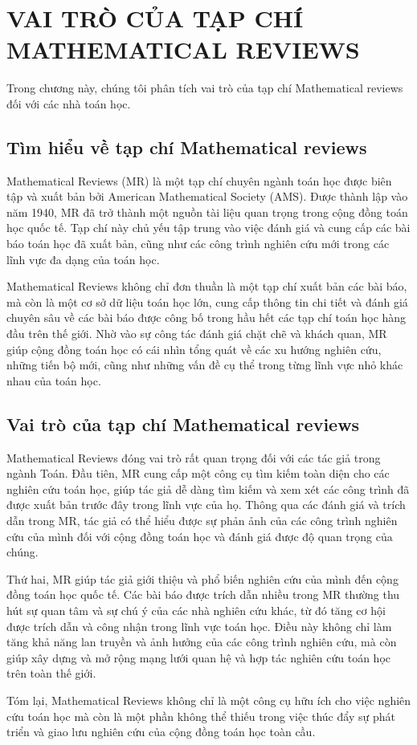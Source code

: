 \chapter{VAI TRÒ CỦA TẠP CHÍ MATHEMATICAL REVIEWS}

Trong chương này, chúng tôi phân tích vai trò của tạp chí Mathematical reviews đối với các nhà toán học.


\section{Tìm hiểu về tạp chí Mathematical reviews}

Mathematical Reviews (MR) là một tạp chí chuyên ngành toán học được biên tập và xuất bản bởi American Mathematical Society (AMS). Được thành lập vào năm 1940, MR đã trở thành một nguồn tài liệu quan trọng trong cộng đồng toán học quốc tế. Tạp chí này chủ yếu tập trung vào việc đánh giá và cung cấp các bài báo toán học đã xuất bản, cũng như các công trình nghiên cứu mới trong các lĩnh vực đa dạng của toán học.

Mathematical Reviews không chỉ đơn thuần là một tạp chí xuất bản các bài báo, mà còn là một cơ sở dữ liệu toán học lớn, cung cấp thông tin chi tiết và đánh giá chuyên sâu về các bài báo được công bố trong hầu hết các tạp chí toán học hàng đầu trên thế giới. Nhờ vào sự công tác đánh giá chặt chẽ và khách quan, MR giúp cộng đồng toán học có cái nhìn tổng quát về các xu hướng nghiên cứu, những tiến bộ mới, cũng như những vấn đề cụ thể trong từng lĩnh vực nhỏ khác nhau của toán học.

\section{Vai trò của tạp chí Mathematical reviews}

Mathematical Reviews đóng vai trò rất quan trọng đối với các tác giả trong ngành Toán. Đầu tiên, MR cung cấp một công cụ tìm kiếm toàn diện cho các nghiên cứu toán học, giúp tác giả dễ dàng tìm kiếm và xem xét các công trình đã được xuất bản trước đây trong lĩnh vực của họ. Thông qua các đánh giá và trích dẫn trong MR, tác giả có thể hiểu được sự phản ảnh của các công trình nghiên cứu của mình đối với cộng đồng toán học và đánh giá được độ quan trọng của chúng.

Thứ hai, MR giúp tác giả giới thiệu và phổ biến nghiên cứu của mình đến cộng đồng toán học quốc tế. Các bài báo được trích dẫn nhiều trong MR thường thu hút sự quan tâm và sự chú ý của các nhà nghiên cứu khác, từ đó tăng cơ hội được trích dẫn và công nhận trong lĩnh vực toán học. Điều này không chỉ làm tăng khả năng lan truyền và ảnh hưởng của các công trình nghiên cứu, mà còn giúp xây dựng và mở rộng mạng lưới quan hệ và hợp tác nghiên cứu toán học trên toàn thế giới.

Tóm lại, Mathematical Reviews không chỉ là một công cụ hữu ích cho việc nghiên cứu toán học mà còn là một phần không thể thiếu trong việc thúc đẩy sự phát triển và giao lưu nghiên cứu của cộng đồng toán học toàn cầu.